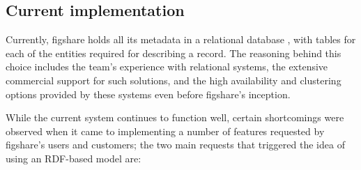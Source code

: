 \subsection{Current implementation}
\label{sec:curr}

Currently, figshare holds all its metadata in a relational database \cite{figsupport}, with
tables for each of the entities required for describing a record. The reasoning behind
this choice includes the team's experience with relational systems, the extensive commercial
support for such solutions, and the high availability and clustering options provided by
these systems even before figshare's inception.

While the current system continues to function well, certain shortcomings were observed
when it came to implementing a number of features requested by figshare's users and customers; the two main requests that triggered the idea of using an RDF-based model are:

